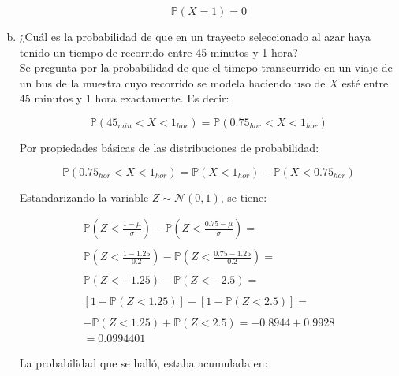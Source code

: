\documentclass[11pt, spanish]{article}
\begin{document}
\begin{enumerate}[(a)]
$$\mathbb{P}\left(X = 1\right) = 0$$

\item ¿Cuál es la probabilidad de que en un trayecto seleccionado al azar haya tenido
un tiempo de recorrido entre 45 minutos y 1 hora?\\

Se pregunta por la probabilidad de que el timepo transcurrido en un viaje de un bus de la muestra cuyo recorrido se modela haciendo uso de $X$ esté entre 45 minutos y 1 hora exactamente. Es decir:

$$\mathbb{P}(45_{min} < X < 1_{hor}) = \mathbb{P}(0.75_{hor} < X < 1_{hor})$$
 
Por propiedades básicas de las distribuciones de probabilidad:
 
$$\mathbb{P}(0.75_{hor} < X < 1_{hor}) = \mathbb{P}(X < 1_{hor}) - \mathbb{P}(X < 0.75_{hor})$$

Estandarizando la variable $Z \sim \mathcal{N} (0, 1)$, se tiene:

\begin{equation}
    \begin{aligned}
    \mathbb{P}\left(Z < \frac{1 - \mu}{\sigma} \right) - \mathbb{P}\left(Z < \frac{0.75 - \mu}{\sigma} \right) =
    \\
    \\
     \mathbb{P}\left(Z < \frac{1 - 1.25}{0.2} \right) - \mathbb{P}\left(Z < \frac{0.75 - 1.25}{0.2} \right) = 
     \\
     \\
     \mathbb{P}\left(Z < -1.25 \right) - \mathbb{P}\left(Z < -2.5 \right) =
     \\
     \\
     \left[ 1 -  \mathbb{P}\left(Z < 1.25 \right) \right] - \left[ 1 - \mathbb{P}\left(Z < 2.5 \right) \right] = 
     \\
     \\
      -\mathbb{P}\left(Z < 1.25 \right) +  \mathbb{P}\left(Z < 2.5 \right) =
      -0.8944 + 0.9928 
      \\
      = 0.0994401
\end{aligned}
\end{equation}

\pagebreak
La probabilidad que se halló, estaba acumulada en:


\end{enumerate}
\end{document}
